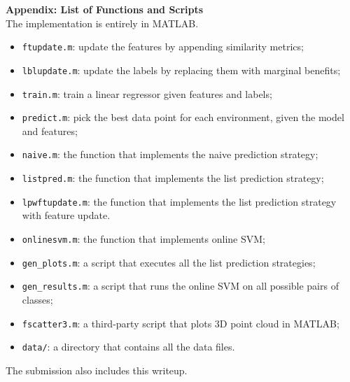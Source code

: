 \documentclass{article}
\begin{document}
{\large\bf Appendix: List of Functions and Scripts}\\[1em]
The implementation is entirely in MATLAB. 
\begin{itemize}\itemsep-1pt
	\item {\tt ftupdate.m}: update the features by appending similarity metrics;
	\item {\tt lblupdate.m}: update the labels by replacing them with marginal benefits;
	\item {\tt train.m}: train a linear regressor given features and labels;
	\item {\tt predict.m}: pick the best data point for each environment, given the model and features;
	\item {\tt naive.m}: the function that implements the naive prediction strategy;
	\item {\tt listpred.m}: the function that implements the list prediction strategy; 
	\item {\tt lpwftupdate.m}: the function that implements the list prediction strategy
		with feature update. 
	\item {\tt onlinesvm.m}: the function that implements online SVM; 
	\item {\tt gen\_plots.m}: a script that executes all the list prediction strategies;
	\item {\tt gen\_results.m}: a script that runs the online SVM on all possible pairs of classes; 
	\item {\tt fscatter3.m}: a third-party script that plots 3D point cloud in MATLAB; 
	\item {\tt data/}: a directory that contains all the data files. 
\end{itemize}
The submission also includes this writeup. 
		
\end{document}

